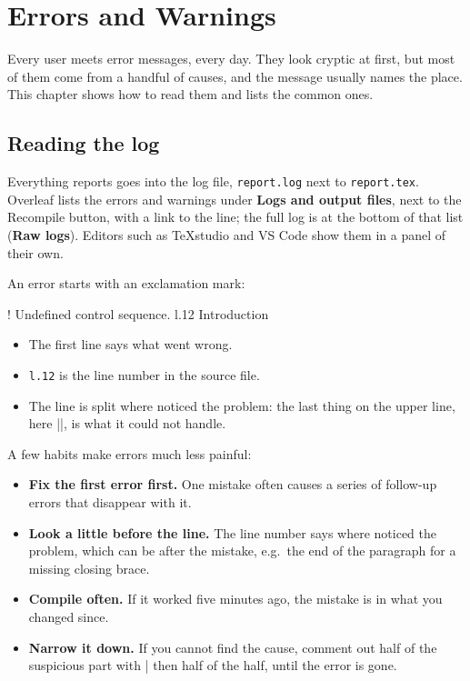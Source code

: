 \chapter{Errors and Warnings}\label{chap:errors}

Every  user meets error messages, every day.
They look cryptic at first, but most of them come from a handful of causes,
and the message usually names the place.
This chapter shows how to read them and lists the common ones.

\section{Reading the log}\label{sec:log}

Everything  reports goes into the log file, \texttt{report.log} next to \texttt{report.tex}.
Overleaf lists the errors and warnings under \textbf{Logs and output files}, next to the Recompile button,
with a link to the line;
the full log is at the bottom of that list (\textbf{Raw logs}).
Editors such as TeXstudio and VS Code show them in a panel of their own.

An error starts with an exclamation mark:

\begin{codeblock}[style=shell]
! Undefined control sequence.
l.12 \sectoin
             {Introduction}
\end{codeblock}

\begin{itemize}
    \item The first line says what went wrong.
    \item \texttt{l.12} is the line number in the source file.
    \item The line is split where  noticed the problem:
        the last thing on the upper line, here \code|\sectoin|, is what it could not handle.
\end{itemize}

A few habits make errors much less painful:

\begin{itemize}
    \item \textbf{Fix the first error first.}
        One mistake often causes a series of follow-up errors that disappear with it.
    \item \textbf{Look a little before the line.}
        The line number says where  noticed the problem, which can be after the mistake,
        e.g.\ the end of the paragraph for a missing closing brace.
    \item \textbf{Compile often.}
        If it worked five minutes ago, the mistake is in what you changed since.
    \item \textbf{Narrow it down.}
        If you cannot find the cause, comment out half of the suspicious part with \code|%
        then half of the half, until the error is gone.
\end{itemize}

